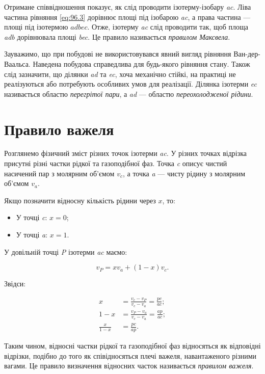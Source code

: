 Отримане співвідношення показує, як слід проводити ізотерму-ізобару \textit{ac}. Ліва частина рівняння
\eqref{eq:96.3} дорівнює площі під ізобарою \textit{ac}, а права частина --- площі під ізотермою
$adbec$. Отже, ізотерму \textit{ac} слід проводити так, щоб площа \textit{adb} дорівнювала
площі \textit{bec}. Це правило називається \emph{правилом Максвела}.

Зауважимо, що при побудові не використовувався явний вигляд рівняння Ван-дер-Ваальса. Наведена
побудова справедлива для будь-якого рівняння стану. Також слід зазначити, що ділянки \textit{ad} та
\textit{ec}, хоча механічно стійкі, на практиці не реалізуються або потребують особливих умов для
реалізації. Ділянка ізотерми \textit{ec} називається областю \emph{перегрітої пари}, а \textit{ad} —
областю \emph{переохолодженої рідини}.

\section{Правило важеля}

Розглянемо фізичний зміст різних точок ізотерми \textit{ac}. У різних точках відрізка присутні різні
частки рідкої та газоподібної фаз. Точка \textit{c} описує чистий насичений пар з молярним об'ємом
$v_c$, а точка \textit{a} --- чисту рідину з молярним об'ємом $v_a$.

Якщо позначити відносну кількість рідини через $x$, то:
\begin{itemize}
\item У точці \textit{c}: $x = 0$;
\item У точці \textit{a}: $x = 1$.
\end{itemize}

У довільній точці \textit{P} ізотерми \textit{ac} маємо:

\begin{equation}
v_P = x v_a + (1 - x) v_c.
\label{eq:97.1}
\end{equation}

Звідси:

\begin{align}
x &= \frac{v_c - v_P}{v_c - v_a} = \frac{pc}{ac}; \label{eq:97.2} \\
1 - x &= \frac{v_P - v_a}{v_c - v_a} = \frac{ap}{ac}; \label{eq:97.3} \\
\frac{x}{1 - x} &= \frac{pc}{ap}. \label{eq:97.4}
\end{align}

Таким чином, відносні частки рідкої та газоподібної фаз відносяться як відповідні відрізки, подібно до того як співідносяться плечі важеля, навантаженого різними вагами. Це правило
визначення відносних часток називається \emph{правилом важеля}.


